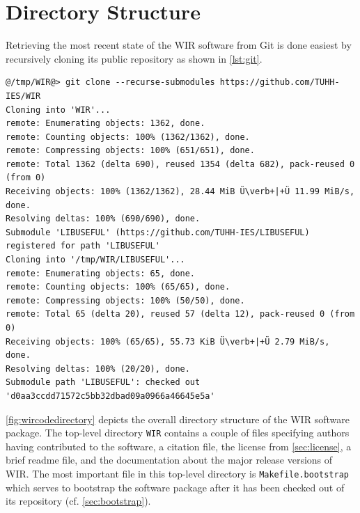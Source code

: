 \chapter{Directory Structure}
\label{chap:directory}
\renewcommand{\sectiontitle}{}

Retrieving the most recent state of the \gls{WIR} software from Git is done easiest by recursively cloning its public repository as shown in \cref{lst:git}.

\begin{lstlisting}[style=commandline,float=h,caption={Cloning of the Public Git Repository},label=lst:git]
@/tmp/WIR@> git clone --recurse-submodules https://github.com/TUHH-IES/WIR
Cloning into 'WIR'...
remote: Enumerating objects: 1362, done.
remote: Counting objects: 100% (1362/1362), done.
remote: Compressing objects: 100% (651/651), done.
remote: Total 1362 (delta 690), reused 1354 (delta 682), pack-reused 0 (from 0)
Receiving objects: 100% (1362/1362), 28.44 MiB Ü\verb+|+Ü 11.99 MiB/s, done.
Resolving deltas: 100% (690/690), done.
Submodule 'LIBUSEFUL' (https://github.com/TUHH-IES/LIBUSEFUL) registered for path 'LIBUSEFUL'
Cloning into '/tmp/WIR/LIBUSEFUL'...
remote: Enumerating objects: 65, done.
remote: Counting objects: 100% (65/65), done.
remote: Compressing objects: 100% (50/50), done.
remote: Total 65 (delta 20), reused 57 (delta 12), pack-reused 0 (from 0)
Receiving objects: 100% (65/65), 55.73 KiB Ü\verb+|+Ü 2.79 MiB/s, done.
Resolving deltas: 100% (20/20), done.
Submodule path 'LIBUSEFUL': checked out 'd0aa3ccdd71572c5bb32dbad09a0966a46645e5a'
\end{lstlisting}

\cref{fig:wircodedirectory} depicts the overall directory structure of the \gls{WIR} software package.
The top-level directory \texttt{WIR} contains a couple of files specifying authors having contributed to the software, a citation file, the license from \cref{sec:license}, a brief readme file, and the documentation about the major release versions of \gls{WIR}.
The most important file in this top-level directory is \texttt{Makefile.bootstrap} which serves to bootstrap the software package after it has been checked out of its repository (cf. \cref{sec:bootstrap}).

